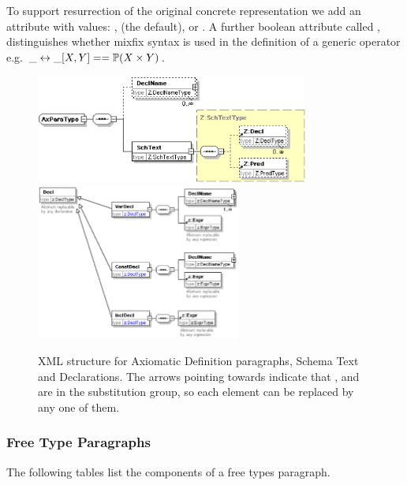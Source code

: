 \documentclass{llncs}  %
\begin{document}
To support resurrection of the original concrete representation we add an
attribute  with values: ,  (the
default), or .  A further boolean attribute called
, distinguishes whether mixfix syntax is used in the 
definition of a generic operator
e.g. $\_ \rel \_ [X,Y] == \power(X \cross Y)$.

\begin{figure}[!htbp]
  \centering
  \includegraphics[width=0.8\textwidth]{axparatype.eps}
  \includegraphics[width=0.6\textwidth]{decls.eps}
  \caption{XML structure for Axiomatic Definition paragraphs, Schema Text
  and Declarations.  The arrows pointing towards  indicate that
  ,  and  are in the
   substitution group, so each  element can be
  replaced by any one of them.}
  \label{fig:axpara}
\end{figure}



\subsubsection{Free Type Paragraphs}

The following tables list the components of a free types paragraph.
\end{document}
